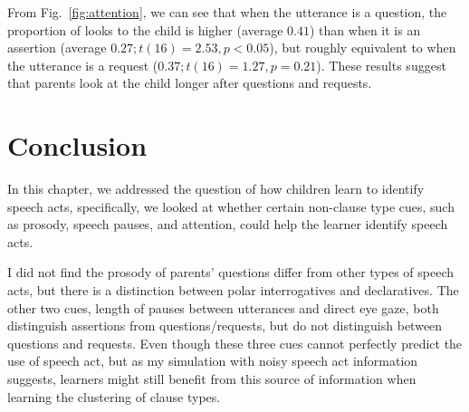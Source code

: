 From Fig.~\ref{fig:attention}, we can see that when the utterance is a question, the proportion of looks to the child is higher (average $0.41$) than when it is an assertion (average $0.27; t(16) = 2.53, p <0.05$), but roughly equivalent to when the utterance is a request ($0.37; t(16)= 1.27, p=0.21$). These results suggest that parents look at the child longer after questions and requests. %

\section{Conclusion}
\label{sec:engsp:discussion}
In this chapter, we addressed the question of how children learn to identify speech acts, specifically, we looked at whether certain non-clause type cues, such as prosody, speech pauses, and attention, could help the learner identify speech acts. 

I did not find the prosody of parents' questions differ from other types of speech acts, but there is a distinction between polar interrogatives and declaratives. The other two cues, length of pauses between utterances and direct eye gaze, both distinguish assertions from questions/requests, but do not distinguish between questions and requests. Even though these three cues cannot perfectly predict the use of speech act, but as my simulation with noisy speech act information suggests, learners might still benefit from this source of information when learning the clustering of clause types.  

